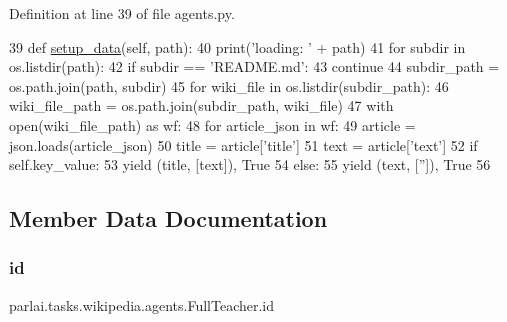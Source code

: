 Definition at line 39 of file agents.\+py.


\begin{DoxyCode}
39     \textcolor{keyword}{def }\hyperlink{namespaceparlai_1_1tasks_1_1multinli_1_1agents_a4fa2cb0ba1ed745336ad8bceed36b841}{setup\_data}(self, path):
40         print(\textcolor{stringliteral}{'loading: '} + path)
41         \textcolor{keywordflow}{for} subdir \textcolor{keywordflow}{in} os.listdir(path):
42             \textcolor{keywordflow}{if} subdir == \textcolor{stringliteral}{'README.md'}:
43                 \textcolor{keywordflow}{continue}
44             subdir\_path = os.path.join(path, subdir)
45             \textcolor{keywordflow}{for} wiki\_file \textcolor{keywordflow}{in} os.listdir(subdir\_path):
46                 wiki\_file\_path = os.path.join(subdir\_path, wiki\_file)
47                 with open(wiki\_file\_path) \textcolor{keyword}{as} wf:
48                     \textcolor{keywordflow}{for} article\_json \textcolor{keywordflow}{in} wf:
49                         article = json.loads(article\_json)
50                         title = article[\textcolor{stringliteral}{'title'}]
51                         text = article[\textcolor{stringliteral}{'text'}]
52                         \textcolor{keywordflow}{if} self.key\_value:
53                             \textcolor{keywordflow}{yield} (title, [text]), \textcolor{keyword}{True}
54                         \textcolor{keywordflow}{else}:
55                             \textcolor{keywordflow}{yield} (text, [\textcolor{stringliteral}{''}]), \textcolor{keyword}{True}
56 
\end{DoxyCode}


\subsection{Member Data Documentation}
\mbox{\label{classparlai_1_1tasks_1_1wikipedia_1_1agents_1_1FullTeacher_a336be0a2ec18a9d19fd58cc4031c30b6}} 
\subsubsection{\texorpdfstring{id}{id}}
{\footnotesize\ttfamily parlai.\+tasks.\+wikipedia.\+agents.\+Full\+Teacher.\+id}



